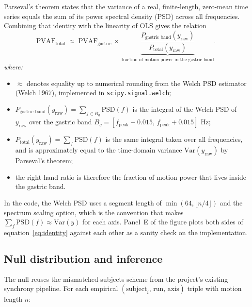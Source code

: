 \documentclass[11pt]{article}
\newcommand{\PVAF}{\mathrm{PVAF}}
\begin{document}
Parseval's theorem states that the variance of a real, finite-length,
zero-mean time series equals the sum of its power spectral density
(PSD) across all frequencies. Combining that identity with the
linearity of OLS gives the relation
\begin{equation}
\PVAF_{\text{total}}
\;\approx\;
\PVAF_{\text{gastric}}
\,\times\,
\underbrace{\dfrac{P_{\text{gastric band}}(y_{\text{raw}})}{P_{\text{total}}(y_{\text{raw}})}}_{\text{fraction of motion power in the gastric band}}.
\label{eq:identity}
\end{equation}
\textit{where:}
\begin{itemize}\setlength{\itemsep}{1pt}
\item $\approx$ denotes equality up to numerical rounding from the Welch
PSD estimator (Welch 1967), implemented in
\texttt{scipy.signal.welch};
\item $P_{\text{gastric band}}(y_{\text{raw}}) = \sum_{f\in B_g}
\mathrm{PSD}(f)$ is the integral of the Welch PSD of $y_{\text{raw}}$
over the gastric band $B_g = [f_{\text{peak}}-0.015,\,
f_{\text{peak}}+0.015]$ Hz;
\item $P_{\text{total}}(y_{\text{raw}}) = \sum_f \mathrm{PSD}(f)$ is the
same integral taken over all frequencies, and is approximately equal to
the time-domain variance $\mathrm{Var}(y_{\text{raw}})$ by Parseval's
theorem;
\item the right-hand ratio is therefore the fraction of motion power
that lives inside the gastric band.
\end{itemize}
In the code, the Welch PSD uses a segment length of
$\min(64,\lfloor n/4 \rfloor)$ and the spectrum scaling
option, which is the convention that makes $\sum_f \mathrm{PSD}(f)
\approx \mathrm{Var}(y)$ for each axis. Panel~E of the figure plots
both sides of equation~\ref{eq:identity} against each other as a
sanity check on the implementation.

\subsection{Null distribution and inference}

The null reuses the mismatched-subjects scheme from the project's
existing synchrony pipeline. For each empirical
$(\text{subject}_{i},\,\text{run},\,\text{axis})$ triple with motion
length $n$:
\end{document}
